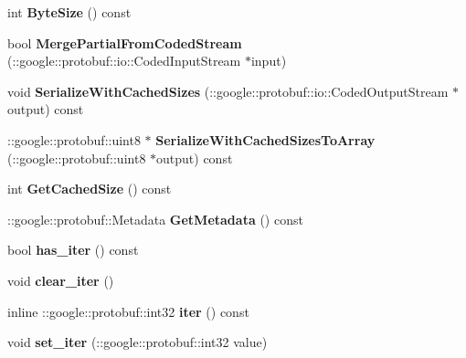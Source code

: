 \begin{DoxyCompactItemize}
int {\bfseries Byte\+Size} () const
\item 
\mbox{\label{classcaffe_1_1_solver_state_ad7aa98c26c4d68fddcd677ab727425a3}} 
bool {\bfseries Merge\+Partial\+From\+Coded\+Stream} (\+::google\+::protobuf\+::io\+::\+Coded\+Input\+Stream $\ast$input)
\item 
\mbox{\label{classcaffe_1_1_solver_state_abcb430afb4a461b0bb4c7952871f361b}} 
void {\bfseries Serialize\+With\+Cached\+Sizes} (\+::google\+::protobuf\+::io\+::\+Coded\+Output\+Stream $\ast$output) const
\item 
\mbox{\label{classcaffe_1_1_solver_state_a330425a1ebaca3ae149bacad17f50a0b}} 
\+::google\+::protobuf\+::uint8 $\ast$ {\bfseries Serialize\+With\+Cached\+Sizes\+To\+Array} (\+::google\+::protobuf\+::uint8 $\ast$output) const
\item 
\mbox{\label{classcaffe_1_1_solver_state_a1d45d579d252298364717a903d2bf3b3}} 
int {\bfseries Get\+Cached\+Size} () const
\item 
\mbox{\label{classcaffe_1_1_solver_state_a5711b591193210e9f58e9801b838361c}} 
\+::google\+::protobuf\+::\+Metadata {\bfseries Get\+Metadata} () const
\item 
\mbox{\label{classcaffe_1_1_solver_state_a3001b35ac6b7dc1eb1c4220caccc58ad}} 
bool {\bfseries has\+\_\+iter} () const
\item 
\mbox{\label{classcaffe_1_1_solver_state_ad5b541b46e7346b9dfffaf8b24c67d4b}} 
void {\bfseries clear\+\_\+iter} ()
\item 
\mbox{\label{classcaffe_1_1_solver_state_af5fd2ec7eb36b97381cd3b9b879e84e5}} 
inline \+::google\+::protobuf\+::int32 {\bfseries iter} () const
\item 
\mbox{\label{classcaffe_1_1_solver_state_ad1c46280bcdfa1d1b6cd8757c52089f8}} 
void {\bfseries set\+\_\+iter} (\+::google\+::protobuf\+::int32 value)
\item 

\end{DoxyCompactItemize}
